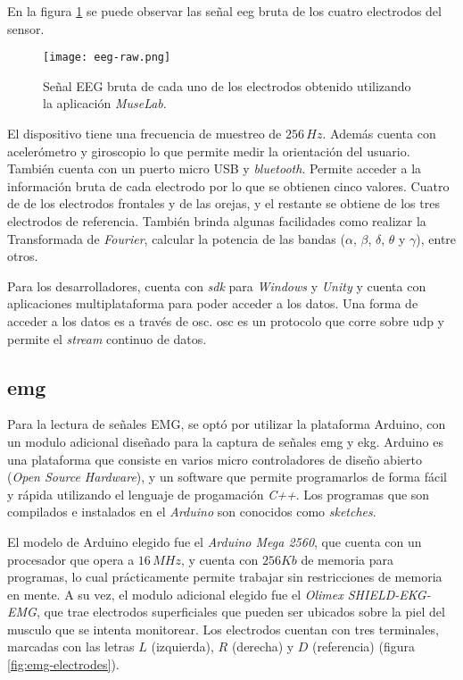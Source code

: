 En la figura \ref{fig:eeg-raw} se puede observar las señal \acrshort{eeg} bruta de los cuatro electrodos del sensor.

\begin{figure}[H]
	\centering
    \texttt{[image: eeg-raw.png]}
    \caption{Señal EEG bruta de cada uno de los electrodos obtenido utilizando la aplicación \emph{MuseLab}.}
	\label{fig:eeg-raw}
\end{figure}

El dispositivo tiene una frecuencia de muestreo de $ 256 \, Hz$. Además cuenta con acelerómetro y giroscopio lo que permite medir la orientación del usuario. También cuenta con un puerto micro USB y \emph{bluetooth}. Permite acceder a la información bruta de cada electrodo por lo que se obtienen cinco valores. Cuatro de de los electrodos frontales y de las orejas, y el restante se obtiene de los tres electrodos de referencia. También brinda algunas facilidades como realizar la Transformada de \emph{Fourier},  calcular la potencia de las bandas ($\alpha$, $\beta$, $\delta$, $\theta$ y $\gamma$), entre otros.

Para los desarrolladores, cuenta con \emph{sdk} para \emph{Windows} y \emph{Unity} y cuenta con aplicaciones multiplataforma para poder acceder a los datos. Una forma de acceder a los datos es a través de \gls{osc}. \acrshort{osc} es un protocolo que corre sobre \acrshort{udp} y permite el \emph{stream} continuo de datos.

\subsection{\acrshort{emg}} \label{emg-hardware}

Para la lectura de señales EMG, se optó por utilizar la plataforma Arduino, con un modulo adicional diseñado para la captura de señales \acrshort{emg} y \acrshort{ekg}.  Arduino es una plataforma que consiste en varios micro controladores de diseño abierto (\emph{Open Source Hardware}), y un software que permite programarlos de forma fácil y rápida utilizando el lenguaje de progamación \emph{C++}. Los programas que son compilados e instalados en el \emph{Arduino} son conocidos como \emph{sketches}.

El modelo de Arduino elegido fue el \emph{Arduino Mega 2560}, que cuenta con un procesador que opera a $16\, MHz$, y cuenta con $256 Kb$ de memoria para programas, lo cual prácticamente permite trabajar sin restricciones de memoria en mente. A su vez, el modulo adicional elegido fue el \emph{Olimex SHIELD-EKG-EMG}, que trae electrodos superficiales que pueden ser ubicados sobre la piel del musculo que se intenta monitorear.  Los electrodos cuentan con tres terminales, marcadas con las letras $L$ (izquierda), $R$ (derecha) y $D$ (referencia) (figura \ref{fig:emg-electrodes}).

